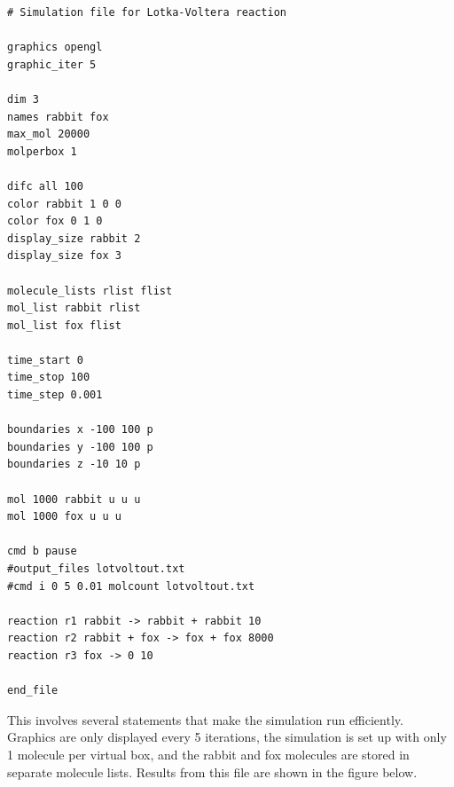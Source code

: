 \documentclass {scrbook}
\begin{document}
\begin{lstlisting}[style=SSAC]
# Simulation file for Lotka-Voltera reaction

graphics opengl
graphic_iter 5

dim 3
names rabbit fox
max_mol 20000
molperbox 1

difc all 100
color rabbit 1 0 0
color fox 0 1 0
display_size rabbit 2
display_size fox 3

molecule_lists rlist flist
mol_list rabbit rlist
mol_list fox flist

time_start 0
time_stop 100
time_step 0.001

boundaries x -100 100 p
boundaries y -100 100 p
boundaries z -10 10 p

mol 1000 rabbit u u u
mol 1000 fox u u u

cmd b pause
#output_files lotvoltout.txt
#cmd i 0 5 0.01 molcount lotvoltout.txt

reaction r1 rabbit -> rabbit + rabbit 10
reaction r2 rabbit + fox -> fox + fox 8000
reaction r3 fox -> 0 10

end_file
\end{lstlisting}

This involves several statements that make the simulation run efficiently. Graphics are only displayed every 5 iterations, the simulation is set up with only 1 molecule per virtual box, and the rabbit and fox molecules are stored in separate molecule lists. Results from this file are shown in the figure below.
\end{document}
